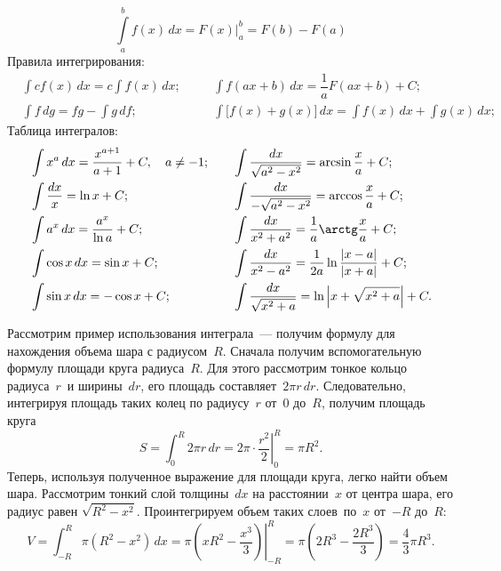 \begin{equation}
	\int\limits^b_a f(x) \,d x = F(x) \biggr|^b_a = F(b) - F(a)
\end{equation}
Правила интегрирования:
\begin{align*}
	&\int c f(x) \,d x = c \int f(x) \,d x;\quad &&  \int f(ax + b) \,d x = \dfrac{1}{a}F(ax + b) + C;\\
	&\int f \,d g = fg - \int g \,d f; && \int \bigl[f(x) + g(x)\bigr] \,d x = \int f(x) \,d x + \int g(x) \,d x;
\end{align*}
Таблица интегралов:
\begin{align*}
	&\int  x^a \,d x = \dfrac{x^{a+1}}{a+1} + C,\quad a \neq -1; \quad
	&&\int \dfrac{dx}{\sqrt{a^2 - x^2}} = \arcsin\dfrac{x}{a} + C;\\
	&\int \frac{dx}{x} = \ln x + C;
	&&\int \dfrac{dx}{-\sqrt{a^2 - x^2}} = \arccos\dfrac{x}{a} + C;\\
	&\int a^x \,d x = \dfrac{a^x}{\ln a} + C;
	&&\int \dfrac{dx}{x^2 + a^2} = \dfrac{1}{a} \arctg \dfrac{x}{a} + C; \\
	&\int \cos x \,d x = \sin x + C;
	&&\int \dfrac{dx}{x^2 - a^2} = \dfrac{1}{2a} \ln \dfrac{|x - a|}{|x + a|} + C;\\
	&\int \sin x \,d x = -\cos x + C;
	&&\int \dfrac{dx}{\sqrt{x^2 + a}} = \ln \left| x + \sqrt{x^2 + a} \right| + C.
\end{align*}

Рассмотрим пример использования интеграла~--- получим формулу для нахождения объема шара с радиусом~$R$. Сначала получим вспомогательную формулу площади круга радиуса~$R$. Для этого рассмотрим тонкое кольцо радиуса~$r$~и ширины~$dr$, его площадь составляет~$2\pi r \,d r$. Следовательно, интегрируя площадь таких колец по радиусу~$r$ от~$0$ до~$R$, получим площадь круга
\begin{equation*}
    S = \int_0^R 2 \pi r \,d r = 2 \pi \cdot \left.\frac{r^2}{2} \right|_0^R = \pi R^2.
\end{equation*}
Теперь, используя полученное выражение для площади круга, легко найти объем шара. Рассмотрим тонкий слой толщины~$dx$ на расстоянии~$x$ от центра шара, его радиус равен $\sqrt{R^2 - x^2}$. Проинтегрируем объем таких слоев~по~$x$ от~$-R$ до~$R$:
\begin{equation*}
    V 
        = \int_{-R}^{R} \pi (R^2 - x^2) \,d x 
        = \pi \left.\left(xR^2 - \frac{x^3}{3}\right)\right|_{-R}^{R}
        = \pi \left(2R^3 - \frac{2R^3}{3} \right) 
        = \frac{4}{3} \pi R^3.
\end{equation*}